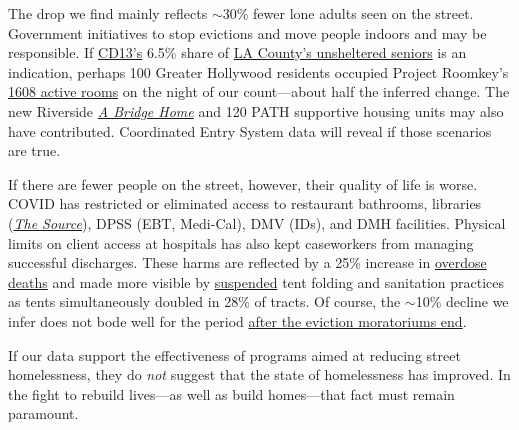 \documentclass[11pt]{article}
\begin{document}
 The drop we find mainly reflects $\sim$30\% fewer lone adults seen on the 
street. Government initiatives to stop evictions and move people indoors and may be 
responsible. If \href{https://www.lahsa.org/documents?id=4672-2020-homeless-count-council-district-13}{CD13's} 6.5\% share of \href{https://www.lahsa.org/documents?id=4585-2020-greater-los-angeles-homeless-count-los-angeles-continuum-of-care-coc-}{LA County's unsheltered seniors} is an indication, perhaps 
100 Greater Hollywood residents occupied Project Roomkey's 
\href{https://projectroomkeytracker.com/}{1608 active rooms} on the night of our count---about 
half the inferred change. The new Riverside \href{https://www.lamayor.org/ABridgeHome}
{\it A Bridge Home} and 120 PATH supportive housing units may also have contributed.
Coordinated Entry System data will reveal if those scenarios are true.

If there are fewer people on the street, however, their quality of life is worse. 
COVID has restricted or eliminated access to restaurant bathrooms, libraries 
(\href{https://www.lapl.org/homeless-resources/the-source}{\it The Source}), DPSS 
(EBT, Medi-Cal), DMV (IDs), and DMH facilities. Physical limits on client access at 
hospitals has also kept caseworkers from managing successful discharges. These harms 
are reflected by a 25\% increase in 
\href{https://www.latimes.com/california/story/2021-01-07/the-powerful-synthetic-opioid-fentanyl-is-behind-rising-deaths-in-the-homeless-population}{overdose deaths} and made more visible by \href{https://clkrep.lacity.org/onlinedocs/2020/20-0147_misc_3-17-20_p.pdf}{suspended}
tent folding and sanitation practices as tents simultaneously doubled in 28\% of tracts.
Of course, the $\sim$10\% decline we infer does not bode well for the period \href{https://www.latimes.com/california/story/2021-01-12/new-report-foresees-tens-of-thousands-losing-homes-by-2023}
{after the eviction moratoriums end}.

If our data support the effectiveness of programs aimed at reducing street homelessness, 
they do {\it not} suggest that the state of homelessness has improved. In the fight to rebuild lives---as well 
as build homes---that fact must remain paramount.
\end{document}
